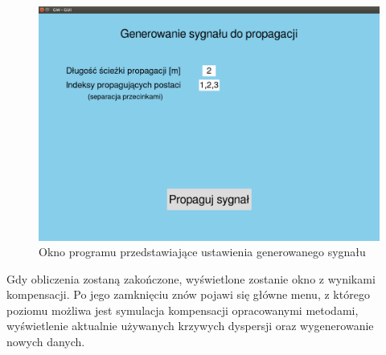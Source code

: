 \begin{figure}[h]
\centering
\includegraphics[width=13cm]{Zdjecia/5/kasia/genersygnal}
\caption{Okno programu przedstawiające ustawienia generowanego sygnału}
\label{fig:genersygnal}
\end{figure}

Gdy obliczenia zostaną zakończone, wyświetlone zostanie okno z wynikami kompensacji. Po jego zamknięciu znów pojawi się główne menu, z którego poziomu możliwa jest symulacja kompensacji opracowanymi metodami, wyświetlenie aktualnie używanych krzywych dyspersji oraz wygenerowanie nowych danych.
